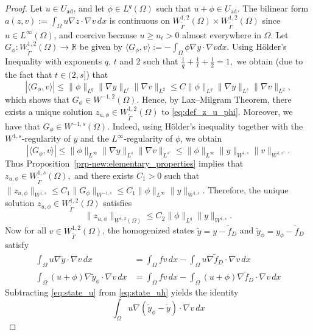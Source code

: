 \documentclass[11pt]{article}
\newcommand{\R}{\mathbb{R}}
\newcommand{\feas}{U_{\textrm{ad}}}
\theoremstyle{definition}
\theoremstyle{remark}
\begin{document}
\begin{proof}
Let $u \in \feas$, and let $\phi \in L^q(\Omega)$ such that $u+\phi \in \feas$. 
The bilinear form
$
a(z,v)
:=
\int_\Omega u \nabla z \cdot \nabla v\,dx $
is continuous on
$W^{1,2}_{\tilde\Gamma}(\Omega)\times
W^{1,2}_{\tilde\Gamma}(\Omega)$ since
$u\in L^\infty(\Omega)$, and coercive because
$u\ge u_\ell>0$ almost everywhere in $\Omega$.
Let $G_\phi: W^{1,2}_{\tilde\Gamma}(\Omega) \to \R$ be given by $ \langle G_\phi, v\rangle
:=
-\int_{\Omega} \phi \nabla y \cdot \nabla v dx$. 
Using
H\"older's Inequality with exponents $q$, $t$ and $2$ such that 
$
\frac1q+\frac1t+\frac12=1,$  we obtain (due to the fact that $t \in (2, s]$) that
$$
\left|
\langle G_\phi, v\rangle
\right|
\le 
\|\phi\|_{L^q}
\|\nabla y\|_{L^t}
\|\nabla v\|_{L^2}
\le C
\|\phi\|_{L^q}
\|\nabla y\|_{L^s}
\|\nabla v\|_{L^2},$$
which shows that $ G_\phi \in 
W^{-1,2}(\Omega)$. Hence, by Lax--Milgram Theorem,
there exists a unique solution 
$z_{u, \phi} \in W^{1,2}_{\tilde\Gamma}(\Omega)$ to \eqref{eq:def_z_u_phi}. 
Moreover, we have that $ G_\phi \in W^{-1,s}(\Omega)$. Indeed,
using H\"older's inequality together with the $W^{1,s}$-regularity of $y$
and the $L^\infty$-regularity of $\phi$, we obtain
\[
|\langle G_\phi,v\rangle|
\le
\|\phi\|_{L^\infty}
\|\nabla y\|_{L^s}
\|\nabla v\|_{L^{s'}}
\le
\|\phi\|_{L^\infty}
\|y\|_{W^{1,s}}
\|v\|_{W^{1,s'}}.
\]
Thus Proposition~\ref{prp-new:elementary_properties} implies that
$ z_{u, \phi} \in W^{1,s}_{\tilde\Gamma}(\Omega),$  and there exists $C_1>0$ such that
$
\| z_{u, \phi}\|_{W^{1,s}}
\le
C_1
\|G_\phi\|_{W^{-1,s}}
\le
C_1
\|\phi\|_{L^\infty}
\|y\|_{W^{1,s}}.$
Therefore, the unique solution
$z_{u, \phi} \in W^{1,2}_{\tilde\Gamma}(\Omega)$ satisfies
$$
\|z_{u, \phi}\|_{W^{1,2}(\Omega)}
\le
C_2
\|\phi\|_{L^q}
\|y\|_{W^{1,s}}.$$
Now for all $v \in W_{\tilde\Gamma}^{1,2}(\Omega)$, the homogenized states $\tilde y = y - \tilde f_D$ and  $\tilde y_{\phi} = y_{\phi} - \tilde f_D$ satisfy
%
\begin{align}
\int_\Omega u \nabla \tilde y \cdot \nabla v \, dx
&=
\int_\Omega f v \, dx
-
\int_\Omega u \nabla \tilde f_D \cdot \nabla v \, dx
\label{eq:state_u}\\
\int_\Omega (u+\phi) \nabla \tilde y_{\phi} \cdot \nabla v \, dx
&=
\int_\Omega f v \, dx
-
\int_\Omega (u+\phi) \nabla \tilde f_D \cdot \nabla v \, dx
\label{eq:state_uh}
\end{align}
%
Subtracting \eqref{eq:state_u} from \eqref{eq:state_uh} yields the identity
%
\[
\int_\Omega u \nabla(\tilde y_{\phi} - \tilde y) \cdot \nabla v \, dx
\]
\end{proof}
\end{document}
